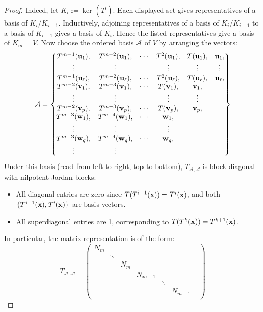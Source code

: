 \begin{proof}
Indeed, let $K_i:=\ker(T^i)$. Each displayed set gives representatives of a basis of $K_i/K_{i-1}$. Inductively, adjoining representatives of a basis of $K_i/K_{i-1}$ to a basis of $K_{i-1}$ gives a basis of $K_i$. Hence the listed representatives give a basis of $K_m=V$. Now choose the ordered basis \( \mathcal{A} \) of $V$ by arranging the vectors:
\[
\mathcal{A} = \left\{ 
\begin{matrix}
T^{m-1}({\bf u}_1), & T^{m-2}({\bf u}_1), & \cdots & T^2({\bf u}_1), & T({\bf u}_1), & {\bf u}_1, \\
\vdots & \vdots &  & \vdots & \vdots & \vdots\\
T^{m-1}({\bf u}_{\ell}), & T^{m-2}({\bf u}_{\ell}), & \cdots & T^2({\bf u}_{\ell}), & T({\bf u}_{\ell}), & {\bf u}_{\ell}, \\
T^{m-2}({\bf v}_1), & T^{m-3}({\bf v}_1), & \cdots & T({\bf v}_1), & {\bf v}_1, &  \\
\vdots & \vdots &  & \vdots & \vdots \\
T^{m-2}({\bf v}_p), & T^{m-3}({\bf v}_p), & \cdots & T({\bf v}_p), & {\bf v}_p, &  \\
T^{m-3}({\bf w}_1), & T^{m-4}({\bf w}_1), & \cdots & {\bf w}_1, &   \\
\vdots & \vdots &  & \vdots \\
T^{m-3}({\bf w}_q), & T^{m-4}({\bf w}_q), & \cdots & {\bf w}_q, &  \\
\vdots & \vdots
\end{matrix} \right\}
\]
Under this basis (read from left to right, top to bottom), \( T_{\mathcal{A},\mathcal{A}} \) is block diagonal with nilpotent Jordan blocks:
\begin{itemize}
  \item All diagonal entries are zero since \( T(T^{i-1}({\bf x})) = T^i({\bf x})\), and both $\{T^{i-1}({\bf x}), T^i({\bf x})\}$ are basis vectors.
  \item All superdiagonal entries are 1, corresponding to \( T(T^{k}({\bf x})) = T^{k+1}({\bf x}) \).
\end{itemize}
In particular, the matrix representation is of the form:
$$T_{\mathcal{A},\mathcal{A}} = \begin{pmatrix}
    N_m & & & & & &\\
    & \ddots & & & & & \\
    & & N_m & & & & \\
    & & & N_{m-1} & & & \\
    & & & & \ddots & & \\
    & & & & & N_{m-1} &  \\

\end{pmatrix}$$
\end{proof}
